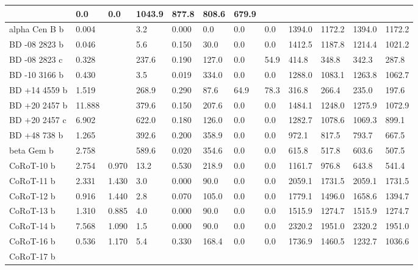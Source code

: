 \documentclass[letterpaper,10pt,english]{sphinxmanual}
\begin{document}
\begin{longtable}{|l|l|l|l|l|l|l|l|l|l|l|l|}
 & 
0.0
 & 
0.0
 & 
1043.9
 & 
877.8
 & 
808.6
 & 
679.9
\\
\hline
alpha Cen B b
 & 
0.004
 &  & 
3.2
 & 
0.000
 & 
0.0
 & 
0.0
 & 
0.0
 & 
1394.0
 & 
1172.2
 & 
1394.0
 & 
1172.2
\\
\hline
BD -08 2823 b
 & 
0.046
 &  & 
5.6
 & 
0.150
 & 
30.0
 & 
0.0
 & 
0.0
 & 
1412.5
 & 
1187.8
 & 
1214.4
 & 
1021.2
\\
\hline
BD -08 2823 c
 & 
0.328
 &  & 
237.6
 & 
0.190
 & 
127.0
 & 
0.0
 & 
54.9
 & 
414.8
 & 
348.8
 & 
342.3
 & 
287.8
\\
\hline
BD -10 3166 b
 & 
0.430
 &  & 
3.5
 & 
0.019
 & 
334.0
 & 
0.0
 & 
0.0
 & 
1288.0
 & 
1083.1
 & 
1263.8
 & 
1062.7
\\
\hline
BD +14 4559 b
 & 
1.519
 &  & 
268.9
 & 
0.290
 & 
87.6
 & 
64.9
 & 
78.3
 & 
316.8
 & 
266.4
 & 
235.0
 & 
197.6
\\
\hline
BD +20 2457 b
 & 
11.888
 &  & 
379.6
 & 
0.150
 & 
207.6
 & 
0.0
 & 
0.0
 & 
1484.1
 & 
1248.0
 & 
1275.9
 & 
1072.9
\\
\hline
BD +20 2457 c
 & 
6.902
 &  & 
622.0
 & 
0.180
 & 
126.0
 & 
0.0
 & 
0.0
 & 
1282.7
 & 
1078.6
 & 
1069.3
 & 
899.1
\\
\hline
BD +48 738 b
 & 
1.265
 &  & 
392.6
 & 
0.200
 & 
358.9
 & 
0.0
 & 
0.0
 & 
972.1
 & 
817.5
 & 
793.7
 & 
667.5
\\
\hline
beta Gem b
 & 
2.758
 &  & 
589.6
 & 
0.020
 & 
354.6
 & 
0.0
 & 
0.0
 & 
615.8
 & 
517.8
 & 
603.6
 & 
507.5
\\
\hline
CoRoT-10 b
 & 
2.754
 & 
0.970
 & 
13.2
 & 
0.530
 & 
218.9
 & 
0.0
 & 
0.0
 & 
1161.7
 & 
976.8
 & 
643.8
 & 
541.4
\\
\hline
CoRoT-11 b
 & 
2.331
 & 
1.430
 & 
3.0
 & 
0.000
 & 
90.0
 & 
0.0
 & 
0.0
 & 
2059.1
 & 
1731.5
 & 
2059.1
 & 
1731.5
\\
\hline
CoRoT-12 b
 & 
0.916
 & 
1.440
 & 
2.8
 & 
0.070
 & 
105.0
 & 
0.0
 & 
0.0
 & 
1779.1
 & 
1496.0
 & 
1658.6
 & 
1394.7
\\
\hline
CoRoT-13 b
 & 
1.310
 & 
0.885
 & 
4.0
 & 
0.000
 & 
90.0
 & 
0.0
 & 
0.0
 & 
1515.9
 & 
1274.7
 & 
1515.9
 & 
1274.7
\\
\hline
CoRoT-14 b
 & 
7.568
 & 
1.090
 & 
1.5
 & 
0.000
 & 
90.0
 & 
0.0
 & 
0.0
 & 
2320.2
 & 
1951.0
 & 
2320.2
 & 
1951.0
\\
\hline
CoRoT-16 b
 & 
0.536
 & 
1.170
 & 
5.4
 & 
0.330
 & 
168.4
 & 
0.0
 & 
0.0
 & 
1736.9
 & 
1460.5
 & 
1232.7
 & 
1036.6
\\
\hline
CoRoT-17 b

\end{longtable}
\end{document}
